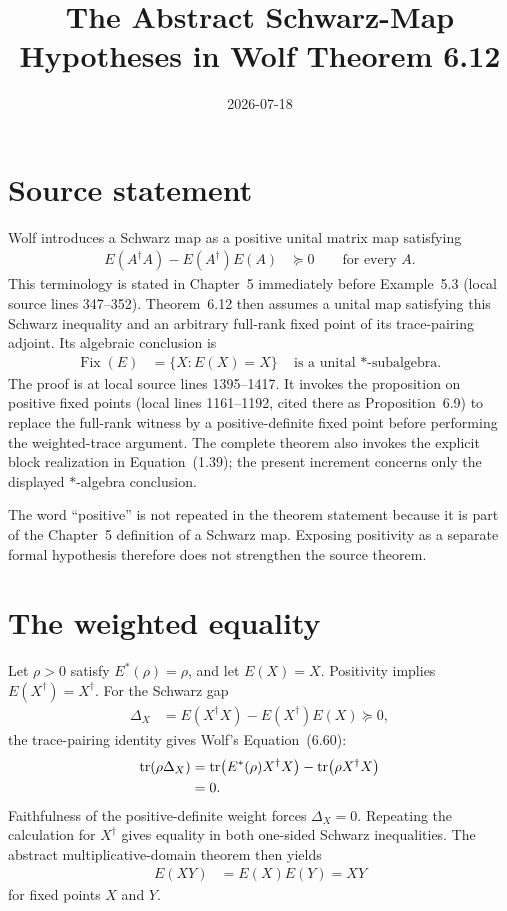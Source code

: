 \documentclass{article}
\title{The Abstract Schwarz-Map Hypotheses in Wolf Theorem 6.12}
\author{}
\date{2026-07-18}
\begin{document}
\maketitle
{}

\section{Source statement}

Wolf introduces a Schwarz map as a positive unital matrix map satisfying
\begin{align}
  E(A^\dagger A)-E(A^\dagger)E(A)&\succeq0
  \qquad\text{for every }A.
  \tag{5.2}
\end{align}
This terminology is stated in Chapter~5 immediately before Example~5.3
(local source lines 347--352).  Theorem~6.12 then assumes a unital map satisfying
this Schwarz inequality and an arbitrary full-rank fixed point of its
trace-pairing adjoint.  Its algebraic conclusion is
\begin{align}
  \operatorname{Fix}(E)&=\{X:E(X)=X\}
  \quad\text{is a unital $*$-subalgebra.}
  \tag{6.12}
\end{align}
The proof is at local source lines 1395--1417.  It invokes the proposition on
positive fixed points (local lines 1161--1192, cited there as Proposition~6.9)
to replace the full-rank witness by a positive-definite fixed point before
performing the weighted-trace argument.
The complete theorem also invokes the explicit block realization in
Equation~(1.39); the present increment concerns only the displayed
$*$-algebra conclusion.

The word ``positive'' is not repeated in the theorem statement because it is
part of the Chapter~5 definition of a Schwarz map.  Exposing positivity as a
separate formal hypothesis therefore does not strengthen the source theorem.

\section{The weighted equality}

Let $\rho>0$ satisfy $E^*(\rho)=\rho$, and let $E(X)=X$.  Positivity implies
$E(X^\dagger)=X^\dagger$.  For the Schwarz gap
\begin{align}
  \Delta_X&=E(X^\dagger X)-E(X^\dagger)E(X)\succeq0,
\end{align}
the trace-pairing identity gives Wolf's Equation~(6.60):
\begin{align}
  \operatorname{tr}(\rho\Delta_X)
    &=\operatorname{tr}\!\left(E^*(\rho)X^\dagger X\right)
      -\operatorname{tr}\!\left(\rho X^\dagger X\right)\\
    &=0.
\end{align}
Faithfulness of the positive-definite weight forces $\Delta_X=0$.  Repeating
the calculation for $X^\dagger$ gives equality in both one-sided Schwarz
inequalities.  The abstract multiplicative-domain theorem then yields
\begin{align}
  E(XY)&=E(X)E(Y)=XY
\end{align}
for fixed points $X$ and $Y$.
\end{document}
